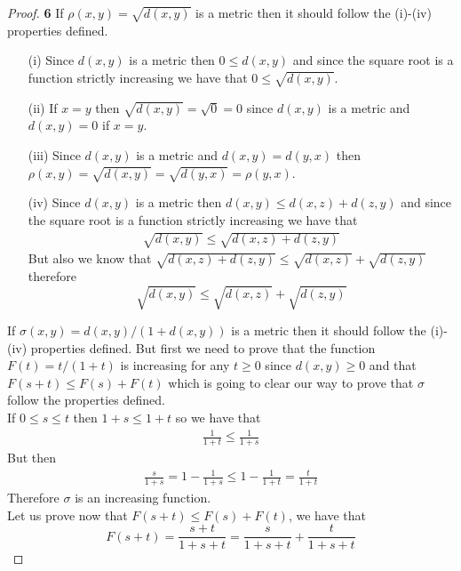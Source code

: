 \documentclass[11pt]{article}
\theoremstyle{definition}
\begin{document}
	\begin{proof}{\textbf{6}}
        If $\rho(x,y) = \sqrt{d(x,y)}$ is a metric then it should follow the (i)-(iv)
        properties defined.
        \begin{itemize}
            \item [(i)] Since $d(x,y)$ is a metric then $0 \leq d(x,y)$ and since 
            the square root is a function strictly increasing we have that
            $0 \leq \sqrt{d(x,y)}$.
            \item [(ii)] If $x=y$ then $\sqrt{d(x,y)} = \sqrt{0} = 0$ since $d(x,y)$ is
            a metric and $d(x,y) = 0$ if $x=y$.
            \item [(iii)] Since $d(x,y)$ is a metric and $d(x,y) = d(y,x)$ then
            $\rho(x,y) = \sqrt{d(x,y)} = \sqrt{d(y,x)} = \rho(y,x)$.
            \item [(iv)] Since $d(x,y)$ is a metric then $d(x,y) \leq d(x,z) + d(z,y)$
            and since  the square root is a function strictly increasing we have that
            \begin{align*}
                \sqrt{d(x,y)} \leq \sqrt{d(x,z) + d(z,y)}
            \end{align*}
            But also we know that $\sqrt{d(x,z) + d(z,y)} \leq \sqrt{d(x,z)} + \sqrt{d(z,y)}$
            therefore $$\sqrt{d(x,y)} \leq \sqrt{d(x,z)} + \sqrt{d(z,y)}$$
        \end{itemize}
        If $\sigma(x,y) = d(x,y)/(1 + d(x,y))$ is a metric then it should follow the
        (i)-(iv) properties defined. But first we need to prove that the function
        $F(t) = t /(1+t)$ is increasing for any $t \geq 0$ since $d(x,y) \geq 0$
        and that $F(s+t) \leq F(s) + F(t)$ which is going to clear our way to prove
        that $\sigma$ follow the properties defined.\\
        If $0 \leq s \leq t$ then $1+s \leq 1+t$ so we have that 
        \begin{align*}
            \frac{1}{1+t} \leq \frac{1}{1+s}
        \end{align*}
        But then
        \begin{align*}
            \frac{s}{1+s} = 1-\frac{1}{1+s} \leq 1-\frac{1}{1+t} = \frac{t}{1+t}
        \end{align*}
        Therefore $\sigma$ is an increasing function.\\
        Let us prove now that $F(s+t) \leq F(s) + F(t)$, we have that
        $$F(s+t) = \frac{s+t}{1+s+t} = \frac{s}{1+s+t} + \frac{t}{1+s+t}$$

\end{proof}
\end{document}
